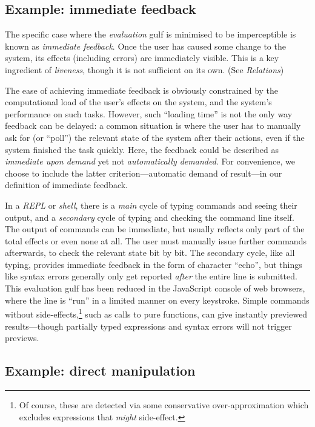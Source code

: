 \documentclass[ twoside,openright,titlepage,numbers=noenddot,headinclude,footinclude,cleardoublepage=empty,abstract=on,
                BCOR=5mm,paper=a4,fontsize=11pt
                ]{scrreprt}
\theoremstyle{definition}
\begin{document}
\hypertarget{example-immediate-feedback}{\subsection{Example: immediate
feedback}\label{example-immediate-feedback}}

The specific case where the \emph{evaluation} gulf is minimised to be
imperceptible is known as \emph{immediate feedback}. Once the user has
caused some change to the system, its effects (including errors) are
immediately visible. This is a key ingredient of \emph{liveness}, though
it is not sufficient on its own. (See \emph{Relations})

The ease of achieving immediate feedback is obviously constrained by the
computational load of the user's effects on the system, and the system's
performance on such tasks. However, such ``loading time'' is not the
only way feedback can be delayed: a common situation is where the user
has to manually ask for (or ``poll'') the relevant state of the system
after their actions, even if the system finished the task quickly. Here,
the feedback could be described as \emph{immediate upon demand} yet not
\emph{automatically demanded}. For convenience, we choose to include the
latter criterion---automatic demand of result---in our definition of
immediate feedback.

In a \emph{REPL} or \emph{shell}, there is a \emph{main} cycle of typing
commands and seeing their output, and a \emph{secondary} cycle of typing
and checking the command line itself. The output of commands can be
immediate, but usually reflects only part of the total effects or even
none at all. The user must manually issue further commands afterwards,
to check the relevant state bit by bit. The secondary cycle, like all
typing, provides immediate feedback in the form of character ``echo'',
but things like syntax errors generally only get reported \emph{after}
the entire line is submitted. This evaluation gulf has been reduced in
the JavaScript console of web browsers, where the line is ``run'' in a
limited manner on every keystroke. Simple commands without
side-effects,\footnote{Of course, these are detected via some
  conservative over-approximation which excludes expressions that
  \emph{might} side-effect.} such as calls to pure functions, can give
instantly previewed results---though partially typed expressions and
syntax errors will not trigger previews.

\hypertarget{example-direct-manipulation}{\subsection{Example: direct
manipulation}\label{example-direct-manipulation}}
\end{document}
